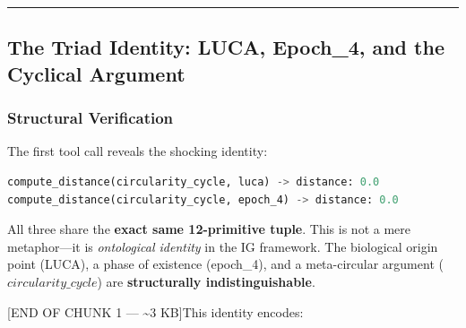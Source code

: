 \documentclass[12pt,a4paper]{article}
\begin{document}
\begin{center}
\rule{0.5\textwidth}{0.4pt}
\end{center}

\subsection{The Triad Identity: LUCA, Epoch\_4, and the Cyclical Argument}

\subsubsection{Structural Verification}

The first tool call reveals the shocking identity:

\begin{lstlisting}[language=Python]
compute_distance(circularity_cycle, luca) -> distance: 0.0
compute_distance(circularity_cycle, epoch_4) -> distance: 0.0
\end{lstlisting}

All three share the \textbf{exact same 12-primitive tuple}. This is not a mere metaphor---it is \emph{ontological identity} in the IG framework. The biological origin point (LUCA), a phase of existence (epoch\_4), and a meta-circular argument ($circularity\_cycle$) are \textbf{structurally indistinguishable}.

{[}END OF CHUNK 1 --- \textasciitilde{}3 KB{]}This identity encodes:
\end{document}
